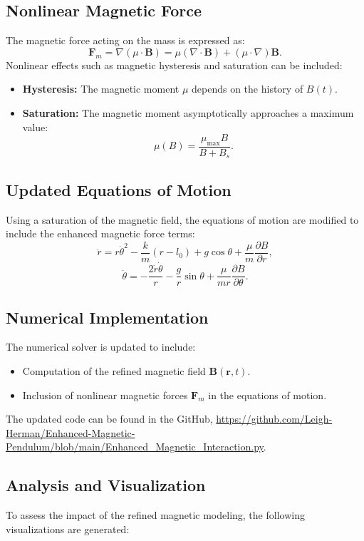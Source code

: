 \documentclass[12pt]{article}
\begin{document}
\subsection{Nonlinear Magnetic Force}
The magnetic force acting on the mass is expressed as:
\[
\mathbf{F}_m = \nabla (\mu \cdot \mathbf{B}) = \mu (\nabla \cdot \mathbf{B}) + (\mu \cdot \nabla) \mathbf{B}.
\]
Nonlinear effects such as magnetic hysteresis and saturation can be included:
\begin{itemize}
    \item \textbf{Hysteresis:} The magnetic moment \( \mu \) depends on the history of \( B(t) \).
    \item \textbf{Saturation:} The magnetic moment asymptotically approaches a maximum value:
    \[
    \mu(B) = \frac{\mu_{\text{max}} B}{B + B_s}.
    \]
\end{itemize}

\subsection{Updated Equations of Motion}
Using a saturation of the magnetic field, the equations of motion are modified to include the enhanced magnetic force terms:
\[
\ddot{r} = r \dot{\theta}^2 - \frac{k}{m}(r - l_0) + g \cos\theta + \frac{\mu}{m} \frac{\partial B}{\partial r},
\]
\[
\ddot{\theta} = -\frac{2 \dot{r} \dot{\theta}}{r} - \frac{g}{r} \sin\theta + \frac{\mu}{m r} \frac{\partial B}{\partial \theta}.
\]

\subsection{Numerical Implementation}
The numerical solver is updated to include:
\begin{itemize}
    \item Computation of the refined magnetic field \( \mathbf{B}(\mathbf{r}, t) \).
    \item Inclusion of nonlinear magnetic forces \( \mathbf{F}_m \) in the equations of motion.
\end{itemize}

The updated code can be found in the GitHub, \url{https://github.com/Leigh-Herman/Enhanced-Magnetic-Pendulum/blob/main/Enhanced_Magnetic_Interaction.py}.

\subsection{Analysis and Visualization}
To assess the impact of the refined magnetic modeling, the following visualizations are generated:
\end{document}
